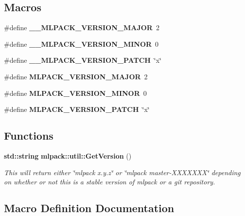 \subsection*{Macros}
\begin{DoxyCompactItemize}
\item 
\#define {\bf \+\_\+\+\_\+\+M\+L\+P\+A\+C\+K\+\_\+\+V\+E\+R\+S\+I\+O\+N\+\_\+\+M\+A\+J\+OR}~2
\item 
\#define {\bf \+\_\+\+\_\+\+M\+L\+P\+A\+C\+K\+\_\+\+V\+E\+R\+S\+I\+O\+N\+\_\+\+M\+I\+N\+OR}~0
\item 
\#define {\bf \+\_\+\+\_\+\+M\+L\+P\+A\+C\+K\+\_\+\+V\+E\+R\+S\+I\+O\+N\+\_\+\+P\+A\+T\+CH}~\char`\"{}x\char`\"{}
\item 
\#define {\bf M\+L\+P\+A\+C\+K\+\_\+\+V\+E\+R\+S\+I\+O\+N\+\_\+\+M\+A\+J\+OR}~2
\item 
\#define {\bf M\+L\+P\+A\+C\+K\+\_\+\+V\+E\+R\+S\+I\+O\+N\+\_\+\+M\+I\+N\+OR}~0
\item 
\#define {\bf M\+L\+P\+A\+C\+K\+\_\+\+V\+E\+R\+S\+I\+O\+N\+\_\+\+P\+A\+T\+CH}~\char`\"{}x\char`\"{}
\end{DoxyCompactItemize}
\subsection*{Functions}
\begin{DoxyCompactItemize}
\item 
{\bf std\+::string} {\bf mlpack\+::util\+::\+Get\+Version} ()
\begin{DoxyCompactList}\small\item\em This will return either \char`\"{}mlpack x.\+y.\+z\char`\"{} or \char`\"{}mlpack master-\/\+X\+X\+X\+X\+X\+X\+X\char`\"{} depending on whether or not this is a stable version of mlpack or a git repository. \end{DoxyCompactList}\end{DoxyCompactItemize}


\subsection{Macro Definition Documentation}
